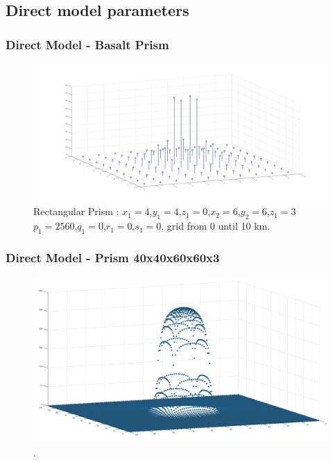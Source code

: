 \documentclass{beamer}
\begin{document}
\subsection{Direct model parameters}
\begin{frame}
\frametitle{Direct Model - Basalt Prism }
\begin{figure}[t!]
\begin{center}
\includegraphics[scale=.15]{./images/grid10.png}
\end{center}
\caption{ Rectangular Prism : $x_1=4$,$y_1=4$,$z_1=0$,$x_2=6$,$y_2=6$,$z_1=3$ $p_1=2560$,$q_1=0$,$r_1=0$,$s_1=0$, grid from 0 until 10 km.}
\label{fluxo_calor}
\end{figure}
\end{frame}
\begin{frame}
\frametitle{Direct Model - Prism 40x40x60x60x3}
\begin{figure}[t!]
\begin{center}
\includegraphics[scale=.20]{./images/gri100x100.png}
\end{center}
\caption{.}
\label{fluxo_calor}
\end{figure}
\end{frame}
\end{document}
